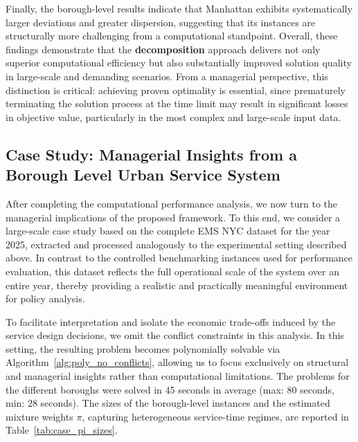 \documentclass[letter,11pt, reqno]{amsart}
\begin{document}
Finally, the borough-level results indicate that Manhattan exhibits systematically larger deviations and greater dispersion, suggesting that its instances are structurally more challenging from a computational standpoint. Overall, these findings demonstrate that the \textbf{decomposition} approach delivers not only superior computational efficiency but also substantially improved solution quality in large-scale and demanding scenarios. From a managerial perspective, this distinction is critical: achieving proven optimality is essential, since prematurely terminating the solution process at the time limit may result in significant losses in objective value, particularly in the most complex and large-scale input data.

\subsection*{Case Study: Managerial Insights from a Borough Level Urban Service System}


After completing the computational performance analysis, we now turn to the managerial implications of the proposed framework. To this end, we consider a large-scale case study based on the complete EMS NYC dataset for the year 2025, extracted and processed analogously to the experimental setting described above. In contrast to the controlled benchmarking instances used for performance evaluation, this dataset reflects the full operational scale of the system over an entire year, thereby providing a realistic and practically meaningful environment for policy analysis. 

To facilitate interpretation and isolate the economic trade-offs induced by the service design decisions, we omit the conflict constraints in this analysis. In this setting, the resulting problem becomes polynomially solvable via Algorithm~\ref{alg:poly_no_conflicts}, allowing us to focus exclusively on structural and managerial insights rather than computational limitations. The problems for the different boroughs were solved in 45 seconds in average (max: 80 seconds, min: 28 seconds). The sizes of the borough-level instances and the estimated mixture weights $\pi$, capturing heterogeneous service-time regimes, are reported in Table~\ref{tab:case_pi_sizes}. 
\end{document}
